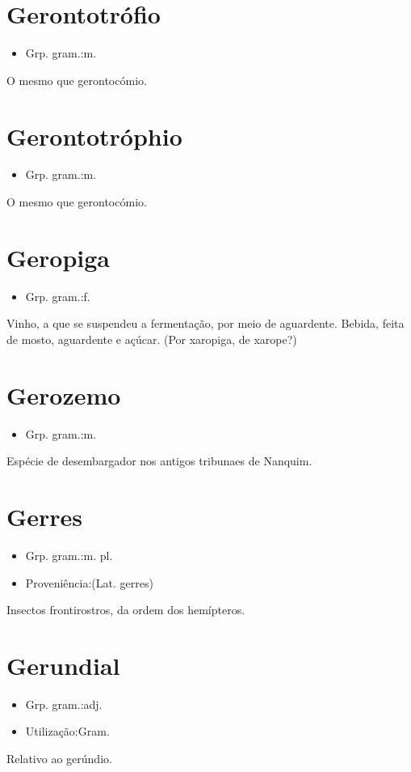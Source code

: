 \section{Gerontotrófio}
\begin{itemize}
\item {Grp. gram.:m.}
\end{itemize}
O mesmo que \textunderscore gerontocómio\textunderscore .
\section{Gerontotróphio}
\begin{itemize}
\item {Grp. gram.:m.}
\end{itemize}
O mesmo que \textunderscore gerontocómio\textunderscore .
\section{Geropiga}
\begin{itemize}
\item {Grp. gram.:f.}
\end{itemize}
Vinho, a que se suspendeu a fermentação, por meio de aguardente.
Bebida, feita de mosto, aguardente e açúcar.
(Por \textunderscore xaropiga\textunderscore , de \textunderscore xarope\textunderscore ?)
\section{Gerozemo}
\begin{itemize}
\item {Grp. gram.:m.}
\end{itemize}
Espécie de desembargador nos antigos tribunaes de Nanquim.
\section{Gerres}
\begin{itemize}
\item {Grp. gram.:m. pl.}
\end{itemize}
\begin{itemize}
\item {Proveniência:(Lat. \textunderscore gerres\textunderscore )}
\end{itemize}
Insectos frontirostros, da ordem dos hemípteros.
\section{Gerundial}
\begin{itemize}
\item {Grp. gram.:adj.}
\end{itemize}
\begin{itemize}
\item {Utilização:Gram.}
\end{itemize}
Relativo ao gerúndio.
